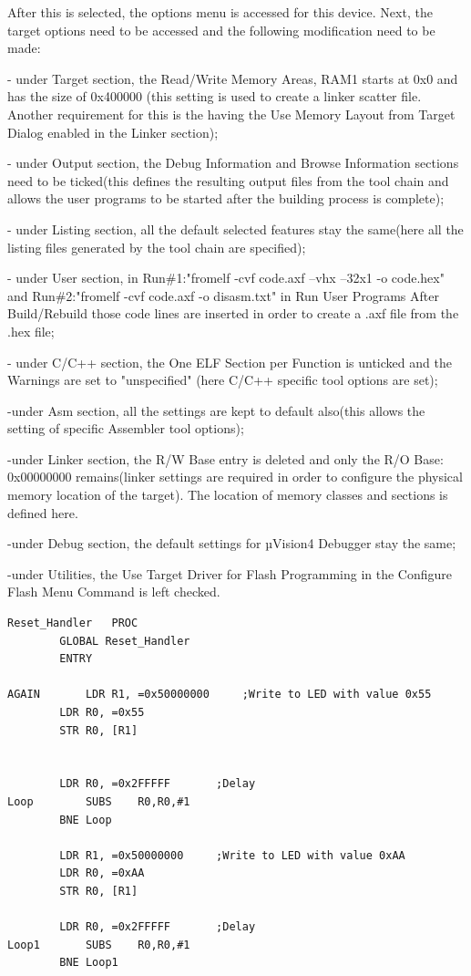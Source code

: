 After this is selected, the options menu is accessed for this device. Next, the target options need to be accessed and the following modification need to be made:

- under Target section, the Read/Write Memory Areas, RAM1 starts at 0x0 and has the size of 0x400000 (this setting is used to create a linker scatter file. Another requirement for this is the having the Use Memory Layout from Target Dialog enabled in the Linker section);

- under Output section, the Debug Information and Browse Information sections need to be ticked(this defines the resulting output files from the tool chain and allows the user programs to be started after the building process is complete);

- under Listing section, all the default selected features stay the same(here all the listing files generated by the tool chain are specified);

- under User section, in Run\#1:"fromelf -cvf code.axf --vhx --32x1 -o code.hex" and Run\#2:"fromelf -cvf code.axf -o disasm.txt" in Run User Programs After Build/Rebuild those code lines are inserted in order to create a .axf file from the .hex file;

- under C/C++ section, the One ELF Section per Function is unticked and the Warnings are set to "unspecified" (here C/C++ specific tool options are set);

-under Asm section, all the settings are kept to default also(this allows the setting of specific Assembler tool options);

-under Linker section, the R/W Base entry is deleted and only the R/O Base: 0x00000000 remains(linker settings are required in order to configure the physical memory location of the target). The location of memory classes and sections is defined here.

-under Debug section, the default settings for µVision4 Debugger stay the same;

-under Utilities, the Use Target Driver for Flash Programming in the Configure Flash Menu Command is left checked.

\begin{lstlisting}[caption={Reset Handler},label={lst:reset-handler}]
Reset_Handler	PROC
		GLOBAL Reset_Handler
		ENTRY

AGAIN		LDR	R1, =0x50000000		;Write to LED with value 0x55
		LDR	R0, =0x55
		STR	R0, [R1]


		LDR	R0, =0x2FFFFF		;Delay
Loop		SUBS	R0,R0,#1
		BNE Loop

		LDR	R1, =0x50000000		;Write to LED with value 0xAA
		LDR	R0, =0xAA
		STR	R0, [R1]

		LDR	R0, =0x2FFFFF		;Delay
Loop1		SUBS	R0,R0,#1
		BNE Loop1
\end{lstlisting}

